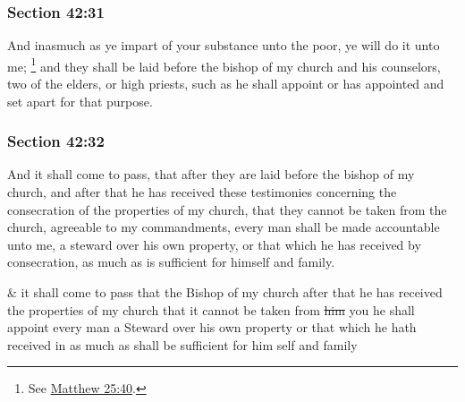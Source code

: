 
	\subsubsection{Section 42:31} %
		\label{DC42-31}

		And inasmuch as ye impart of your substance unto the poor, ye will do it unto me;%
			\footnote{%
				See \hyperref[MATTHEW-25-40]{Matthew 25:40}.
				}
		and they shall be laid before the bishop of my church and his counselors, two of the elders, or high priests, such as he shall appoint or has appointed and set apart for that purpose.


	\subsubsection{Section 42:32} %
		\label{DC42-32}

		And it shall come to pass, that after they are laid before the bishop of my church, and after that he has received these testimonies concerning the consecration of the properties of my church, that they cannot be taken from the church, agreeable to my commandments, every man shall be made accountable unto me, a steward over his own property, or that which he has received by consecration, as much as is sufficient for himself and family.

		\begin{framed}
		\scriptsize
			\begin{compactdesc}
				\item[JSP] \& it shall come to pass that the Bishop of my church after that he has received the properties of my church that it cannot be taken from \sout{him} you he shall appoint every man a Steward over his own property or that which he hath received in as much as shall be sufficient for him self and family
			\end{compactdesc}
		\end{framed}

